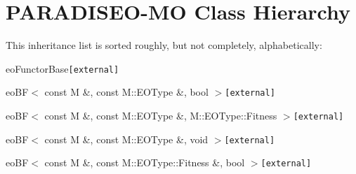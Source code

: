 \section{PARADISEO-MO Class Hierarchy}
This inheritance list is sorted roughly, but not completely, alphabetically:\begin{CompactList}
\item {}
\item eoFunctorBase{\tt  [external]}\begin{CompactList}
\item eoBF$<$ const M \&, const M::EOType \&, bool $>${\tt  [external]}\begin{CompactList}
\item {}
\begin{CompactList}
\item {}
\item {}
\end{CompactList}
\end{CompactList}
\item eoBF$<$ const M \&, const M::EOType \&, M::EOType::Fitness $>${\tt  [external]}\begin{CompactList}
\item {}
\end{CompactList}
\item eoBF$<$ const M \&, const M::EOType \&, void $>${\tt  [external]}\begin{CompactList}
\item {}
\end{CompactList}
\item eoBF$<$ const M \&, const M::EOType::Fitness \&, bool $>${\tt  [external]}\begin{CompactList}
\item {}
\begin{CompactList}
\item {}
\item {}

\end{CompactList}
\end{CompactList}
\end{CompactList}
\end{CompactList}
